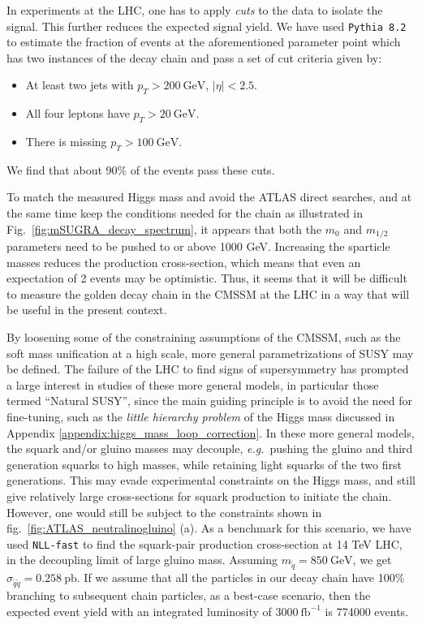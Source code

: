 \documentclass[twoside,english]{uiofysmaster}
\begin{document}
In experiments at the LHC, one has to apply {\it cuts} to the data to isolate the signal. This further reduces the expected signal yield. We have used {\tt Pythia 8.2} \cite{Sjostrand:2014zea} to estimate the fraction of events at the aforementioned parameter point which has two instances of the decay chain and pass a set of cut criteria given by: 
\begin{itemize}
	\item At least two jets with $p_T > 200~\mathrm{GeV}$, $|\eta|<2.5$.
	\item All four leptons have $p_T > 20~\mathrm{GeV}$.
	\item There is missing $p_T > 100~\mathrm{GeV}$.
\end{itemize}
We find that about 90\% of the events pass these cuts.

To match the measured Higgs mass and avoid the ATLAS direct searches, and at the same time keep the conditions needed for the chain as illustrated in Fig.\ \ref{fig:mSUGRA_decay_spectrum}, it appears that both the $m_0$ and $m_{1/2}$ parameters need to be pushed to or above 1000 GeV. Increasing the sparticle masses reduces the production cross-section, which means that even an expectation of 2 events may be optimistic. Thus, it seems that it will be difficult to measure the golden decay chain in the CMSSM at the LHC in a way that will be useful in the present context.

By loosening some of the constraining assumptions of the CMSSM, such as the soft mass unification at a high scale, more general parametrizations of SUSY may be defined. The failure of the LHC to find signs of supersymmetry has prompted a large interest in studies of these more general models, in particular those  termed ``Natural SUSY'', since the main guiding principle is to avoid the need for fine-tuning, such as the {\it little hierarchy problem} of the Higgs mass discussed in Appendix \ref{appendix:higgs_mass_loop_correction}. In these more general models, the squark and/or gluino masses may decouple, {\it e.g.}\ pushing the gluino and third generation squarks to high masses, while retaining light squarks of the two first generations. This may evade experimental constraints on the Higgs mass, and still give relatively large cross-sections for squark production to initiate the chain. However, one would still be subject to the constraints shown in fig.~\ref{fig:ATLAS_neutralinogluino} (a). As a benchmark for this scenario, we have used {\tt NLL-fast} to find the squark-pair production cross-section at 14 TeV LHC, in the decoupling limit of large gluino mass. Assuming $m_{\tilde q} = 850~\mathrm{GeV}$, we get $\sigma_{\tilde q \tilde q} = 0.258~\mathrm{pb}$. If we assume that all the particles in our decay chain have 100\% branching to subsequent chain particles, as a best-case scenario, then the expected event yield with an integrated luminosity of $3000~\mathrm{fb}^{-1}$ is 774000 events.
\end{document}
